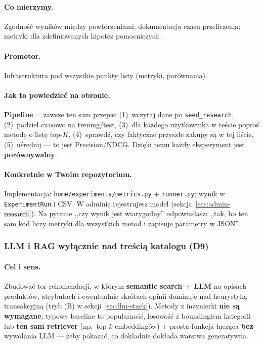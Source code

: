 \documentclass[a4paper,11pt]{article}
\newcommand{\code}[1]{\texttt{\small #1}}
\begin{document}
\paragraph{Co mierzymy.}
Zgodność wyników między powtórzeniami; dokumentacja czasu przeliczenia; metryki dla zdefiniowanych hipotez pomocniczych.

\paragraph{Promotor.}
Infrastruktura pod wszystkie punkty listy (metryki, porównania).

\paragraph{Jak to powiedzieć na obronie.}
\textbf{Pipeline} = zawsze ten sam przepis: (1)~wczytaj dane po \texttt{seed\_research}, (2)~podziel czasowo na trening/test, (3)~dla każdego użytkownika w teście poproś metodę o listę top-$K$, (4)~sprawdź, czy faktyczne przyszłe zakupy są w tej liście, (5)~uśrednij --- to jest Precision/NDCG. Dzięki temu każdy eksperyment jest \textbf{porównywalny}.

\paragraph{Konkretnie w Twoim repozytorium.}
Implementacja: \code{home/experiments/metrics.py} + \code{runner.py}; wynik w \code{ExperimentRun} i CSV. W adminie rejestrujesz model (sekcja~\ref{sec:admin-research}). Na pytanie ,,czy wynik jest wiarygodny'' odpowiadasz: ,,tak, bo ten sam kod liczy metryki dla wszystkich metod i zapisuje parametry w JSON''.

\subsubsection{LLM i RAG wyłącznie nad treścią katalogu (\textbf{D9})}

\paragraph{Cel i sens.}
Zbudować tor rekomendacji, w którym \textbf{semantic search + LLM} na opisach produktów, atrybutach i ewentualnie skrótach opinii dominuje nad heurystyką transakcyjną (tryb (B) w sekcji~\ref{sec:llm-stack}). Metody z inżynierki \textbf{nie są wymagane}; typowy baseline to popularność, losowość z boundingiem kategorii lub \textbf{ten sam retriever} (np.\ top-$k$ embeddingów) + prosta funkcja łącząca \textbf{bez} wywołania LLM --- żeby pokazać, co dokładnie dokłada warstwa generatywna.
\end{document}
